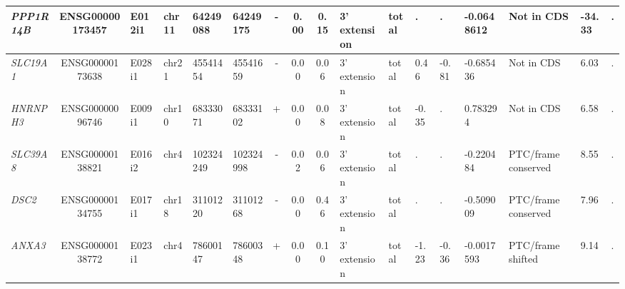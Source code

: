 \begin{appendices}
\begin{landscape}
\begin{table}
{\begin{tabular}{|l|c|l|l|l|l|c|c|c|l|l|l|l|l|l|l|l|}
		\textit{PPP1R14B} & ENSG00000173457 & E012i1 & chr11 & 64249088 & 64249175 & -     & 0.00  & 0.15  & 3' extension & total & . & . & -0.0648612 & Not in CDS     & -34.33 & . \\ \hline
		\textit{SLC19A1} & ENSG00000173638 & E028i1 & chr21 & 45541454 & 45541659 & -     & 0.00  & 0.06  & 3' extension & total & 0.46  & -0.81 & -0.685436 & Not in CDS     & 6.03  & . \\ \hline
		\textit{HNRNPH3} & ENSG00000096746 & E009i1 & chr10 & 68333071 & 68333102 & +     & 0.00  & 0.08  & 3' extension & total & -0.35 & . & 0.783294 & Not in CDS     & 6.58  & . \\ \hline
		\textit{SLC39A8} & ENSG00000138821 & E016i2 & chr4  & 102324249 & 102324998 & -     & 0.02  & 0.06  & 3' extension & total & . & . & -0.220484 & PTC/frame conserved & 8.55  & . \\ \hline
		\textit{DSC2} & ENSG00000134755 & E017i1 & chr18 & 31101220 & 31101268 & -     & 0.00  & 0.46  & 3' extension & total & . & . & -0.509009 & PTC/frame conserved & 7.96  & . \\ \hline
		\textit{ANXA3} & ENSG00000138772 & E023i1 & chr4  & 78600147 & 78600348 & +     & 0.00  & 0.10  & 3' extension & total & -1.23 & -0.36 & -0.0017593 & PTC/frame shifted & 9.14  & . \\ \hline
	\end{tabular}%
	} 
\end{table}%


\end{landscape}

\clearpage
\end{appendices}